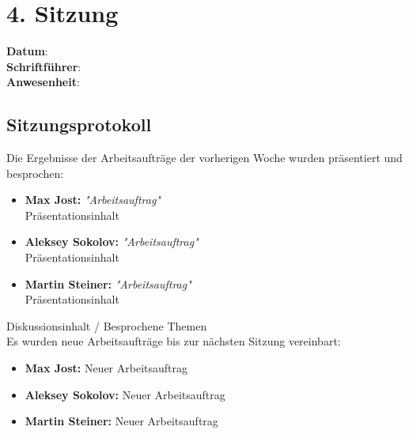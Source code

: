 \section{4. Sitzung}
\label{sec:4_sitzung}

\textbf{Datum}:\\
\textbf{Schriftführer}:\\
\textbf{Anwesenheit}: 

\subsection*{Sitzungsprotokoll}

Die Ergebnisse der Arbeitsaufträge der vorherigen Woche wurden präsentiert und besprochen:
\begin{itemize}
    \item \textbf{Max Jost:} \textit{"Arbeitsauftrag"}\\
    Präsentationsinhalt
    \item \textbf{Aleksey Sokolov:} \textit{"Arbeitsauftrag"}\\
    Präsentationsinhalt
    \item \textbf{Martin Steiner:} \textit{"Arbeitsauftrag"}\\
    Präsentationsinhalt
\end{itemize}

Diskussionsinhalt / Besprochene Themen \\


Es wurden neue Arbeitsaufträge bis zur nächsten Sitzung vereinbart:

\begin{itemize}
    \item \textbf{Max Jost:} Neuer Arbeitsauftrag
    \item \textbf{Aleksey Sokolov:} Neuer Arbeitsauftrag
    \item \textbf{Martin Steiner:} Neuer Arbeitsauftrag
\end{itemize}

\newpage